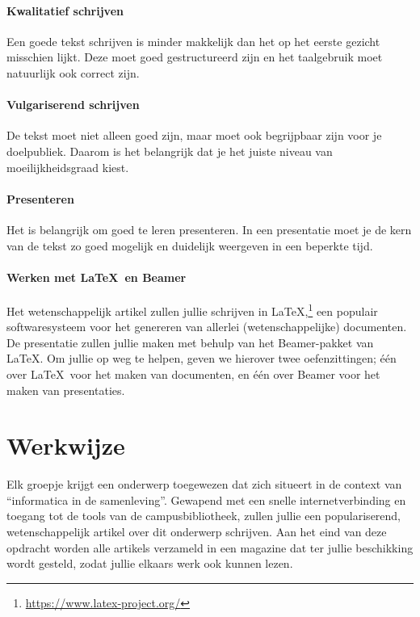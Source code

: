 \documentclass[a4paper]{article}
\begin{document}
\paragraph{Kwalitatief schrijven}
Een goede tekst schrijven is minder makkelijk dan het op het eerste gezicht misschien lijkt.
Deze moet goed gestructureerd zijn en het taalgebruik moet natuurlijk ook correct zijn.

\paragraph{Vulgariserend schrijven}
De tekst moet niet alleen goed zijn, maar moet ook begrijpbaar zijn voor je doelpubliek.
Daarom is het belangrijk dat je het juiste niveau van moeilijkheidsgraad kiest.

\paragraph{Presenteren}
Het is belangrijk om goed te leren presenteren.
In een presentatie moet je de kern van de tekst zo goed mogelijk en duidelijk weergeven in een beperkte tijd.

\paragraph{Werken met \LaTeX~en \textbf{Beamer}}
Het wetenschappelijk artikel zullen jullie schrijven in \LaTeX,\footnote{\url{https://www.latex-project.org/}} een populair softwaresysteem voor het genereren van allerlei (wetenschappelijke) documenten.
De presentatie zullen jullie maken met behulp van het Beamer-pakket van \LaTeX.
Om jullie op weg te helpen, geven we hierover twee oefenzittingen; \'e\'en over \LaTeX~voor het maken van documenten, en \'e\'en over Beamer voor het maken van presentaties.


\section{Werkwijze}

Elk groepje krijgt een onderwerp toegewezen dat zich situeert in de context van ``informatica in de samenleving''.
Gewapend met een snelle internetverbinding en toegang tot de tools van de campusbibliotheek, zullen jullie een populariserend, wetenschappelijk artikel over dit onderwerp schrijven.
Aan het eind van deze opdracht worden alle artikels verzameld in een magazine dat ter jullie beschikking wordt gesteld, zodat jullie elkaars werk ook kunnen lezen.
\end{document}
